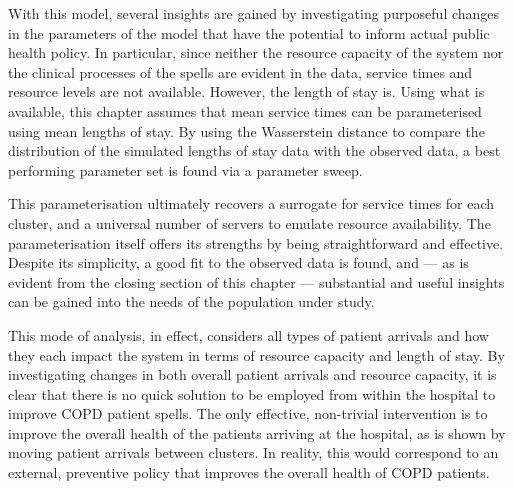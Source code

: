 With this model, several insights are gained by investigating purposeful changes
in the parameters of the model that have the potential to inform actual public
health policy. In particular, since neither the resource capacity of the system
nor the clinical processes of the spells are evident in the data, service times
and resource levels are not available. However, the length of stay is. Using
what is available, this chapter assumes that mean service times can be
parameterised using mean lengths of stay. By using the Wasserstein distance to
compare the distribution of the simulated lengths of stay data with the observed
data, a best performing parameter set is found via a parameter sweep.

This parameterisation ultimately recovers a surrogate for service times for each
cluster, and a universal number of servers to emulate resource availability. The
parameterisation itself offers its strengths by being straightforward and
effective. Despite its simplicity, a good fit to the observed data is found,
and --- as is evident from the closing section of this chapter --- substantial
and useful insights can be gained into the needs of the population under study.

This mode of analysis, in effect, considers all types of patient arrivals and
how they each impact the system in terms of resource capacity and length of
stay. By investigating changes in both overall patient arrivals and resource
capacity, it is clear that there is no quick solution to be employed from within
the hospital to improve COPD patient spells. The only effective, non-trivial
intervention is to improve the overall health of the patients arriving at the
hospital, as is shown by moving patient arrivals between clusters. In reality,
this would correspond to an external, preventive policy that improves the
overall health of COPD patients.
